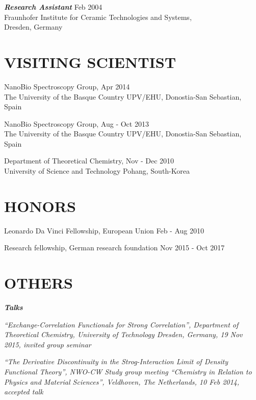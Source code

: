 \documentclass[line,margin]{res}
\begin{document}
\begin{resume}
                {\sl\textbf{Research Assistant}} \hfill\smallskip Feb 2004 \\
                \hspace*{1cm} Fraunhofer Institute for Ceramic Technologies and Systems,\\
                \hspace*{1cm} Dresden, Germany


\section{VISITING SCIENTIST}    NanoBio Spectroscopy Group, \hfill Apr 2014\\
                The University of the Basque Country UPV/EHU, Donostia-San Sebastian, Spain
                
                NanoBio Spectroscopy Group, \hfill Aug - Oct 2013\\
                The University of the Basque Country UPV/EHU, Donostia-San Sebastian, Spain
                
                Department of Theoretical Chemistry, \hfill Nov - Dec 2010\\
				University of Science and Technology Pohang, South-Korea   

\section{HONORS} Leonardo Da Vinci Fellowship, European Union \hfill Feb - Aug 2010

				Research fellowship, German research foundation \hfill Nov 2015 - Oct 2017

\section{OTHERS}   	{\sl\textbf{Talks}}\smallskip\\
					\hspace*{.5cm}\parbox[t]{12.5cm}{\sl ``Exchange-Correlation Functionals for Strong Correlation'', Department of Theoretical Chemistry, University of Technology Dresden, Germany, 19 Nov 2015, invited group seminar}

					\hspace*{.5cm}\parbox[t]{12.5cm}{\sl ``The Derivative Discontinuity in the Strog-Interaction Limit of Density Functional Theory'', NWO-CW Study group meeting ``Chemistry in Relation to Physics and Material Sciences'', Veldhoven, The Netherlands, 10 Feb 2014, accepted talk}


\end{resume}
\end{document}
